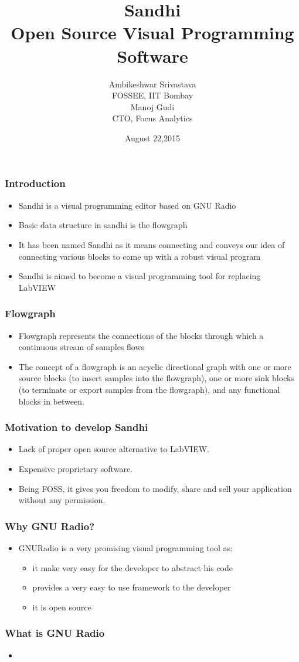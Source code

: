 \documentclass{beamer}
\title[Sandhi
\insertframenumber/\inserttotalframenumber]{Sandhi\\ Open Source Visual Programming Software}
\author[Sandhi Team, IIT Bombay]{Ambikeshwar Srivastava \\FOSSEE, IIT Bombay \\Manoj Gudi\\ CTO, Focus Analytics}
\date{August 22,2015}
\begin{document}
\begin{frame}
\titlepage
\end{frame}

\begin{frame}
	\frametitle{Introduction}
	\begin{itemize}
		\item Sandhi is a visual programming editor based on GNU Radio
		\item Basic data structure in sandhi is the flowgraph
		\item It has been named Sandhi as it means connecting and conveys our idea of connecting various blocks to come up with a robust visual program
		\item Sandhi is aimed to become a visual programming tool for replacing LabVIEW
	\end{itemize}
\end{frame}

\begin{frame}
        \frametitle{Flowgraph}
        \begin{itemize}
        \item Flowgraph represents the connections of the blocks through which a continuous stream of samples flows
        \item The concept of a flowgraph is an acyclic directional graph with one or more source blocks (to insert samples into the flowgraph), one or more sink blocks (to terminate or export samples from the flowgraph), and any functional blocks in between.
        \end{itemize}
\end{frame}

\begin{frame}
        \frametitle{Motivation to develop Sandhi}
        \begin{itemize}
		\item Lack of proper open source alternative to LabVIEW.
		\item  Expensive proprietary software.
		\item  Being FOSS, it gives you freedom to modify, share and sell your application without any permission. 
        \end{itemize}
\end{frame}

\begin{frame}
        \frametitle{Why GNU Radio?}
        \begin{itemize}
		\item GNURadio is a very promising visual programming tool as:
	\begin{itemize}
		\item it make very easy for the developer to abstract his code
		\item provides a very easy to use framework to the developer
		\item it is open source
	\end{itemize}
        \end{itemize}
\end{frame}

\begin{frame}
        \frametitle{What is GNU Radio}
        \begin{itemize}
		\item 
        \end{itemize}
\end{frame}
\end{document}
